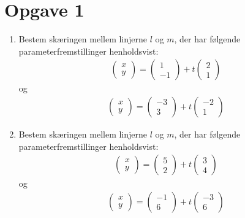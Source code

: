 \section*{Opgave 1}
\begin{enumerate}[label=\roman*)]

\item Bestem skæringen mellem linjerne $l$ og $m$, der har følgende parameterfremstillinger henholdsvist:
\begin{align*}
\begin{pmatrix}
x \\ y
\end{pmatrix}
= 
\begin{pmatrix}
1 \\ -1
\end{pmatrix}
+
t
\begin{pmatrix}
2 \\ 1
\end{pmatrix}
\end{align*}
og 
\begin{align*}
\begin{pmatrix}
x \\ y
\end{pmatrix}
= 
\begin{pmatrix}
-3 \\ 3
\end{pmatrix}
+
t
\begin{pmatrix}
-2 \\ 1
\end{pmatrix}
\end{align*}

\item Bestem skæringen mellem linjerne $l$ og $m$, der har følgende parameterfremstillinger henholdsvist:
\begin{align*}
\begin{pmatrix}
x \\ y
\end{pmatrix}
= 
\begin{pmatrix}
5 \\ 2
\end{pmatrix}
+
t
\begin{pmatrix}
3 \\ 4
\end{pmatrix}
\end{align*}
og 
\begin{align*}
\begin{pmatrix}
x \\ y
\end{pmatrix}
= 
\begin{pmatrix}
-1 \\ 6
\end{pmatrix}
+
t
\begin{pmatrix}
-3 \\ 6
\end{pmatrix}
\end{align*}


\end{enumerate}

